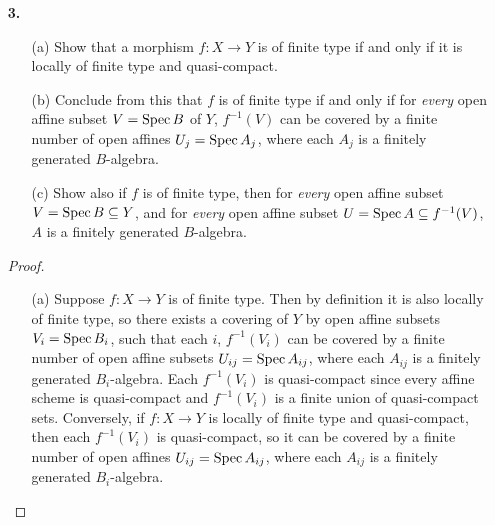 \documentclass{article}
\begin{document}
\begin{enumerate} [label=\textbf{\arabic*.}, leftmargin=0em]
\begin{proof}
    We reduce to proving the following statement: let $f : X \to Y$ be a morphism of schemes with $Y$ affine, which can be covered by open subsets $V_i$ such that $f^{-1}(V_i)$ is quasi-compact in $X$. Then $X$ is quasi-compact. Indeed, $Y$ is quasi-compact, so a finite number of $i$ will do, and a finite union of quasi-compact sets is quasi-compact, and $X = f^{-1}(Y) = f^{-1}(\bigcup_{i = 1}^n V_i) = \bigcup_{i = 1}^n f^{-1}(V_i)$, hence $X$ is quasi-compact.
\end{proof}

\item[\textbf{3.}]
\begin{itemize}
    \item[(a)] Show that a morphism $f : X \to Y$ is of finite type if and only if it is locally of finite type and quasi-compact.
    \item[(b)] Conclude from this that $f$ is of finite type if and only if for \textit{every} open affine subset $V = \operatorname{Spec}{B}$ of $Y$, $f^{-1}(V)$ can be covered by a finite number of open affines $U_j = \operatorname{Spec}{A_j}$, where each $A_j$ is a finitely generated $B$-algebra.
    \item[(c)] Show also if $f$ is of finite type, then for \textit{every} open affine subset $V = \operatorname{Spec}{B} \subseteq Y$, and for \textit{every} open affine subset $U = \operatorname{Spec}{A} \subseteq f^{-1}(V)$, $A$ is a finitely generated $B$-algebra.
\end{itemize}

\begin{proof} $ $ \vspace{0pt}
\begin{itemize} [leftmargin=0cm]
    \item[(a)] Suppose $f : X \to Y$ is of finite type. Then by definition it is also locally of finite type, so there exists a covering of $Y$ by open affine subsets $V_i = \operatorname{Spec}{B_i}$, such that each $i$, $f^{-1}(V_i)$ can be covered by a finite number of open affine subsets $U_{ij} = \operatorname{Spec}{A_{ij}}$, where each $A_{ij}$ is a finitely generated $B_i$-algebra. Each $f^{-1}(V_i)$ is quasi-compact since every affine scheme is quasi-compact and $f^{-1}(V_i)$ is a finite union of quasi-compact sets. Conversely, if $f : X \to Y$ is locally of finite type and quasi-compact, then each $f^{-1}(V_i)$ is quasi-compact, so it can be covered by a finite number of open affines $U_{ij} = \operatorname{Spec}{A_{ij}}$, where each $A_{ij}$ is a finitely generated $B_i$-algebra.


\end{itemize}
\end{proof}
\end{enumerate}
\end{document}
